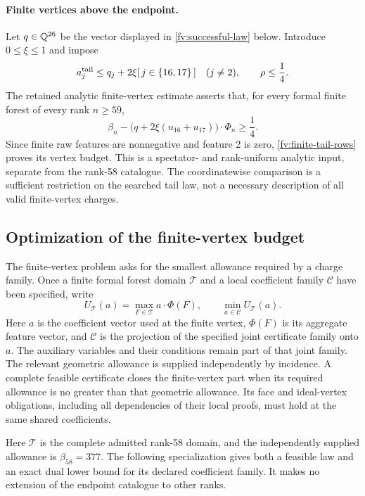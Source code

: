 \paragraph{Finite vertices above the endpoint.}
Let $q\in\mathbb Q^{26}$ be the vector displayed in
\eqref{fv:successful-law} below. Introduce $0\le\xi\le1$ and impose
\begin{equation}\label{fv:finite-tail-rows}
 a^{\rm tail}_j\le q_j+2\xi[\,j\in\{16,17\}\,]
       \quad(j\ne2),\qquad \rho\le\frac14.
\end{equation}
The retained analytic finite-vertex estimate asserts that, for every
formal finite forest of every rank $n\ge59$,
\[
 \beta_n-\bigl(q+2\xi(u_{16}+u_{17})\bigr)\cdot\Phi_n
                                                       \ge\frac14.
\]
Since finite raw features are nonnegative and feature 2 is zero,
\eqref{fv:finite-tail-rows} proves its vertex budget. This is a
spectator- and rank-uniform analytic input, separate from the rank-58
catalogue. The coordinatewise comparison is a sufficient restriction
on the searched tail law, not a necessary description of all valid
finite-vertex charges.

\subsection{Optimization of the finite-vertex budget}
\label{fv:377}

The finite-vertex problem asks for the smallest allowance required
by a charge family. Once a finite formal forest domain $\mathcal T$ and a
local coefficient family $\mathcal C$ have been specified, write
\begin{equation}\label{fv:budget-template}
 U_{\mathcal T}(a)=\max_{F\in\mathcal T}a\cdot\Phi(F),
 \qquad \min_{a\in\mathcal C}U_{\mathcal T}(a).
\end{equation}
Here $a$ is the coefficient vector used at the finite vertex,
$\Phi(F)$ is its aggregate feature vector, and $\mathcal C$ is the
projection of the specified joint certificate family onto $a$.
The auxiliary variables and their conditions remain part of that
joint family.
The relevant geometric allowance is supplied independently by
incidence. A complete feasible certificate closes the finite-vertex
part when its required allowance is no greater than that geometric
allowance. Its face and ideal-vertex obligations, including all
dependencies of their local proofs, must hold at the same shared
coefficients.

Here $\mathcal T$ is the complete admitted rank-58 domain, and the
independently supplied allowance is $\beta_{58}=377$. The following
specialization gives both a feasible law and an exact dual lower bound
for its declared coefficient family. It makes no extension of the
endpoint catalogue to other ranks.

